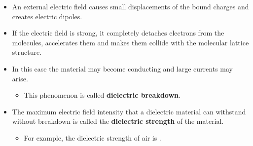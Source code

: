 \begin{ELexample}{}
\begin{ELsolution}

\end{ELsolution}

\end{ELexample}

\ELhold


\begin{ELunit}

\begin{itemize}
\tightlist
\item
  An external electric field causes small displacements of the bound charges and creates electric dipoles.
\item
  If the electric field is strong, it completely detaches electrons from the molecules, accelerates them and makes them collide with the molecular lattice structure.
\item
  In this case the material may become conducting and large currents may arise.

  \begin{itemize}
  \tightlist
  \item
    This phenomenon is called \textbf{dielectric breakdown}.
  \end{itemize}
\item
  The maximum electric field intensity that a dielectric material can withstand without breakdown is called the \textbf{dielectric strength} of the material.

  \begin{itemize}
  \tightlist
  \item
    For example, the dielectric strength of air is .
  \end{itemize}
\end{itemize}

\end{ELunit}

